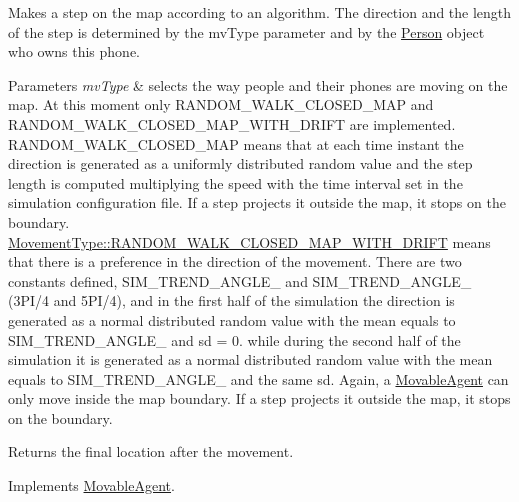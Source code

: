 Makes a step on the map according to an algorithm. The direction and the length of the step is determined by the mv\+Type parameter and by the \mbox{\hyperlink{class_person}{Person}} object who owns this phone. 
\begin{DoxyParams}{Parameters}
{\em mv\+Type} & selects the way people and their phones are moving on the map. At this moment only R\+A\+N\+D\+O\+M\+\_\+\+W\+A\+L\+K\+\_\+\+C\+L\+O\+S\+E\+D\+\_\+\+M\+AP and R\+A\+N\+D\+O\+M\+\_\+\+W\+A\+L\+K\+\_\+\+C\+L\+O\+S\+E\+D\+\_\+\+M\+A\+P\+\_\+\+W\+I\+T\+H\+\_\+\+D\+R\+I\+FT are implemented. R\+A\+N\+D\+O\+M\+\_\+\+W\+A\+L\+K\+\_\+\+C\+L\+O\+S\+E\+D\+\_\+\+M\+AP means that at each time instant the direction is generated as a uniformly distributed random value and the step length is computed multiplying the speed with the time interval set in the simulation configuration file. If a step projects it outside the map, it stops on the boundary. \mbox{\hyperlink{_movement_type_8h_a8a93b61bc797a7d1907f42796a252493a19d5a14b0e46bf765f243b7e2b7b8810}{Movement\+Type\+::\+R\+A\+N\+D\+O\+M\+\_\+\+W\+A\+L\+K\+\_\+\+C\+L\+O\+S\+E\+D\+\_\+\+M\+A\+P\+\_\+\+W\+I\+T\+H\+\_\+\+D\+R\+I\+FT}} means that there is a preference in the direction of the movement. There are two constants defined, S\+I\+M\+\_\+\+T\+R\+E\+N\+D\+\_\+\+A\+N\+G\+L\+E\+\_ and S\+I\+M\+\_\+\+T\+R\+E\+N\+D\+\_\+\+A\+N\+G\+L\+E\+\_ (3P\+I/4 and 5P\+I/4), and in the first half of the simulation the direction is generated as a normal distributed random value with the mean equals to S\+I\+M\+\_\+\+T\+R\+E\+N\+D\+\_\+\+A\+N\+G\+L\+E\+\_ and sd = 0. while during the second half of the simulation it is generated as a normal distributed random value with the mean equals to S\+I\+M\+\_\+\+T\+R\+E\+N\+D\+\_\+\+A\+N\+G\+L\+E\+\_ and the same sd. Again, a \mbox{\hyperlink{class_movable_agent}{Movable\+Agent}} can only move inside the map boundary. If a step projects it outside the map, it stops on the boundary.\\
\hline
\end{DoxyParams}
\begin{DoxyReturn}{Returns}
the final location after the movement. 
\end{DoxyReturn}


Implements \mbox{\hyperlink{class_movable_agent_a35299e133c6787689b553d74ce5f98f0}{Movable\+Agent}}.

\mbox{\label{class_mobile_phone_ad4db8203e8f2e974733357d7c3e6cf28}} 
